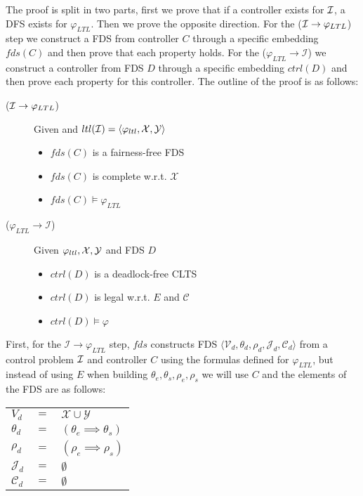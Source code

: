 The proof is split in two parts, first we prove that if a controller exists for ${\mathcal{I}}$, a DFS exists for $\varphi_{LTL}$. Then we prove the opposite direction. For the (${\mathcal{I}} \rightarrow \varphi_{LTL}$) step we construct a FDS from controller $C$ through a specific embedding $fds(C)$ and then prove that each property holds. For the ($\varphi_{LTL} \rightarrow \mathcal{I}$) we construct a controller from FDS $D$ through a specific embedding $ctrl(D)$ and then prove each property for this controller. The outline of the proof is as follows:

\begin{description}
	\item[(${\mathcal{I}} \rightarrow \varphi_{LTL}$)] Given \controlProblemDef and $ltl({\mathcal{I}}) = \langle \varphi_{ltl}, {\mathcal{X}}, {\mathcal{Y}}\rangle$
		\begin{itemize}
			\item $fds(C)$ is a fairness-free FDS			
			\item $fds(C)$ is complete w.r.t. $\mathcal{X}$
			\item $fds(C) \models \varphi_{LTL}$
		\end{itemize}
	\item[($\varphi_{LTL} \rightarrow \mathcal{I}$)] Given $\varphi_{ltl}, {\mathcal{X}}, {\mathcal{Y}}$ and FDS $D$
		\begin{itemize}
			\item $ctrl(D)$ is a deadlock-free CLTS			
			\item $ctrl(D)$ is legal w.r.t. $E$ and $\mathcal{C}$
			\item $ctrl(D) \models \varphi$
		\end{itemize}	
\end{description}

First,  for the $\mathcal{I} \rightarrow \varphi_{LTL}$ step, $fds$ constructs FDS $\langle \mathcal V_d, \theta_d, \rho_d, \mathcal{J}_d, \mathcal{C}_d \rangle$ from a control problem ${\mathcal{I}}$ and controller $C$ using the formulas defined for $\varphi_{LTL}$, but instead of using $E$ when building $\theta_e,\theta_s,\rho_e,\rho_s$ we will use $C$ and the elements of the FDS are as follows:

	\begin{tabular}{ l c l }
	$V_d$ & $=$ & $\mathcal{X} \cup \mathcal{Y}$\\	
	$\theta_d$ & $=$ & $(\theta_e \implies \theta_s)$\\
	$\rho_d$ & $=$ & $(\rho_e \implies \rho_s)$\\	
	$\mathcal{J}_d$ & $=$ & $\emptyset$\\
	$\mathcal{C}_d$ & $=$ & $\emptyset$\\
\end{tabular}

